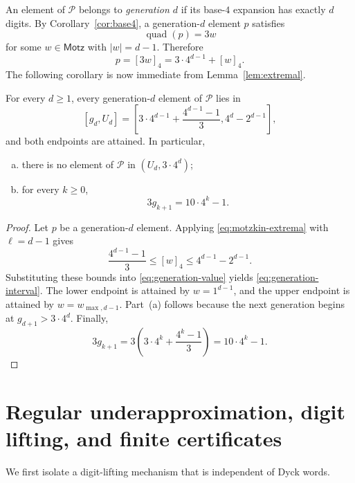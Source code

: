 \documentclass{ws-ijfcs}
\newcommand{\Pset}{\mathcal P}
\begin{document}
An element of $\Pset$ belongs to \emph{generation $d$} if its base-$4$
expansion has exactly $d$ digits.  By Corollary~\ref{cor:base4}, a
generation-$d$ element $p$ satisfies
\[
 \operatorname{quad}(p)=3w
\]
for some $w\in\mathsf{Motz}$ with $|w|=d-1$.  Therefore
\begin{equation}\label{eq:generation-value}
 p=[3w]_4=3\cdot4^{d-1}+[w]_4.
\end{equation}
The following corollary is now immediate from Lemma~\ref{lem:extremal}.

\begin{corollary}\label{cor:gen}
For every $d\geq1$, every generation-$d$ element of $\Pset$ lies in
\begin{equation}\label{eq:generation-interval}
  [g_d,U_d]
  =\left[
  3\cdot4^{d-1}+\frac{4^{d-1}-1}{3},
  4^d-2^{d-1}
  \right],
\end{equation}
and both endpoints are attained.  In particular,
\begin{enumerate}[(a)]
\item there is no element of $\Pset$ in $(U_d,3\cdot4^d)$;
\item for every $k\geq0$,
\begin{equation}\label{eq:three-g}
  3g_{k+1}=10\cdot4^k-1.
\end{equation}
\end{enumerate}
\end{corollary}

\begin{proof}
Let $p$ be a generation-$d$ element.  Applying
\eqref{eq:motzkin-extrema} with $\ell=d-1$ gives
\[
 \frac{4^{d-1}-1}{3}
 \leq[w]_4
 \leq4^{d-1}-2^{d-1}.
\]
Substituting these bounds into \eqref{eq:generation-value} yields
\eqref{eq:generation-interval}.  The lower
endpoint is attained by $w=1^{d-1}$, and the upper endpoint is attained by
$w=w_{\max,d-1}$.  Part~(a) follows because the next generation begins at
$g_{d+1}>3\cdot4^d$.  Finally,
\[
  3g_{k+1}
  =3\left(3\cdot4^k+\frac{4^k-1}{3}\right)
  =10\cdot4^k-1.
\]
\end{proof}

\section{Regular underapproximation, digit lifting, and finite certificates}
\label{sec:lifting}

We first isolate a digit-lifting mechanism that is independent of Dyck
words.
\end{document}
